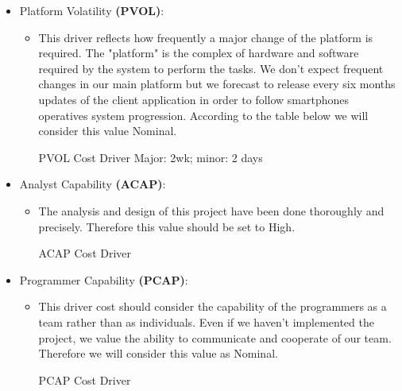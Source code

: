 \begin{itemize}
	\item Platform Volatility \textbf{(PVOL)}: 
	\begin{itemize}
	\item[]This driver reflects how frequently a major change of the platform is required. The "platform" is the complex of hardware and software required by the system to perform the tasks. We don't expect frequent changes in our main platform but we forecast to release every six months updates of the client application in order to follow smartphones operatives system progression. According to the table below we will consider this value \textsf{Nominal}.
	\begin{costdriverstable}{PVOL Cost Driver}
			{Major: 2wk; minor: 2 days}{}\hline
	\end{costdriverstable}
	\end{itemize}
\end{itemize}

\begin{itemize}
	\item Analyst Capability \textbf{(ACAP)}: 
	\begin{itemize}
	\item[] The analysis and design of this project have been done thoroughly and precisely. Therefore this value should be set to \textsf{High}.
	\begin{costdriverstable}{ACAP Cost Driver}
		\hline
	\end{costdriverstable}
	\end{itemize}
\end{itemize}

\begin{itemize}
	\item Programmer Capability \textbf{(PCAP)}: 
	\begin{itemize}
	\item[] This driver cost should consider the capability of the programmers as a team rather than as individuals. Even if we haven't implemented the project, we value the ability to communicate and cooperate of our team. Therefore we will consider this value as \textsf{Nominal}.
	\begin{costdriverstable}{PCAP Cost Driver}
		\hline
	\end{costdriverstable}
	\end{itemize}
\end{itemize}

